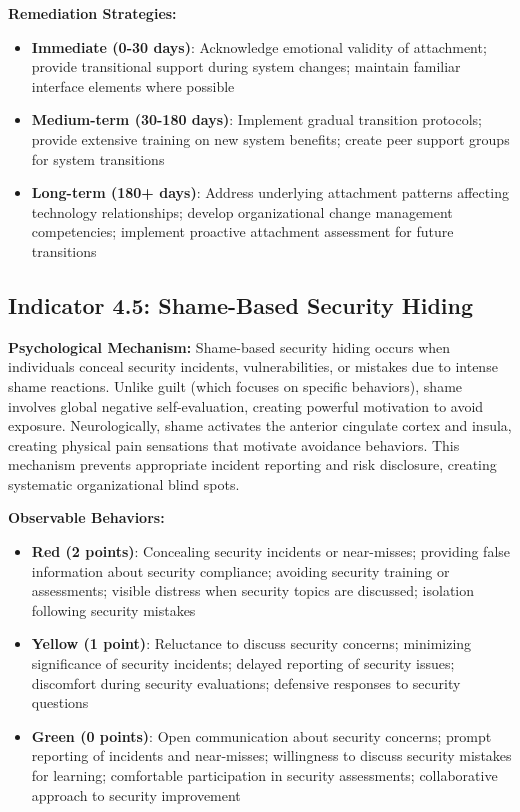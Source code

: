 \documentclass[11pt,a4paper]{article}
\begin{document}
\textbf{Remediation Strategies:}
\begin{itemize}
\item \textbf{Immediate (0-30 days)}: Acknowledge emotional validity of attachment; provide transitional support during system changes; maintain familiar interface elements where possible
\item \textbf{Medium-term (30-180 days)}: Implement gradual transition protocols; provide extensive training on new system benefits; create peer support groups for system transitions
\item \textbf{Long-term (180+ days)}: Address underlying attachment patterns affecting technology relationships; develop organizational change management competencies; implement proactive attachment assessment for future transitions
\end{itemize}

\subsection{Indicator 4.5: Shame-Based Security Hiding}

\textbf{Psychological Mechanism:}
Shame-based security hiding occurs when individuals conceal security incidents, vulnerabilities, or mistakes due to intense shame reactions. Unlike guilt (which focuses on specific behaviors), shame involves global negative self-evaluation, creating powerful motivation to avoid exposure\cite{tangney1996}. Neurologically, shame activates the anterior cingulate cortex and insula, creating physical pain sensations that motivate avoidance behaviors. This mechanism prevents appropriate incident reporting and risk disclosure, creating systematic organizational blind spots.

\textbf{Observable Behaviors:}
\begin{itemize}
\item \textbf{Red (2 points)}: Concealing security incidents or near-misses; providing false information about security compliance; avoiding security training or assessments; visible distress when security topics are discussed; isolation following security mistakes
\item \textbf{Yellow (1 point)}: Reluctance to discuss security concerns; minimizing significance of security incidents; delayed reporting of security issues; discomfort during security evaluations; defensive responses to security questions
\item \textbf{Green (0 points)}: Open communication about security concerns; prompt reporting of incidents and near-misses; willingness to discuss security mistakes for learning; comfortable participation in security assessments; collaborative approach to security improvement
\end{itemize}
\end{document}

